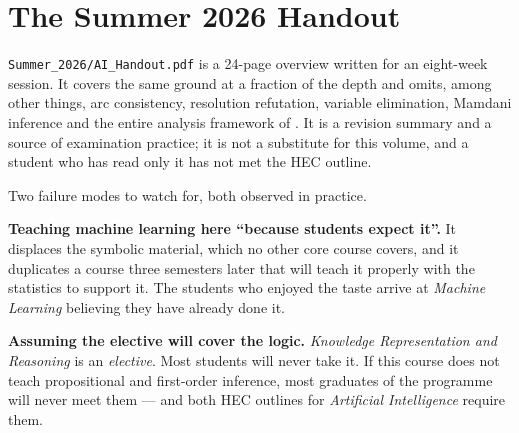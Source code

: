 \section{The Summer 2026 Handout}

\texttt{Summer\_2026/AI\_Handout.pdf} is a 24-page overview written for an
eight-week session. It covers the same ground at a fraction of the depth and omits,
among other things, arc consistency, resolution refutation, variable elimination,
Mamdani inference and the entire analysis framework of . It is a
revision summary and a source of examination practice; it is not a substitute for
this volume, and a student who has read only it has not met the HEC outline.

\begin{alertbox}
Two failure modes to watch for, both observed in practice.

\smallskip
\textbf{Teaching machine learning here ``because students expect it''.} It
displaces the symbolic material, which no other core course covers, and it
duplicates a course three semesters later that will teach it properly with the
statistics to support it. The students who enjoyed the taste arrive at
\emph{Machine Learning} believing they have already done it.

\smallskip
\textbf{Assuming the elective will cover the logic.} \emph{Knowledge
Representation and Reasoning} is an \emph{elective}. Most students will never take
it. If this course does not teach propositional and first-order inference, most
graduates of the programme will never meet them --- and both HEC outlines for
\emph{Artificial Intelligence} require them.
\end{alertbox}
